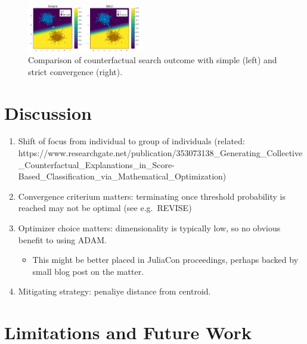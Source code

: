 \documentclass[
  conference]{IEEEtran}
\providecommand{\tightlist}{%
  \setlength{\itemsep}{0pt}\setlength{\parskip}{0pt}}\usepackage{longtable,booktabs,array}
\begin{document}
\begin{figure}

{\centering \includegraphics[width=0.45\textwidth,height=\textheight]{www/gravitational_generator_comparison.png}

}

\caption{\label{fig-convergence}Comparison of counterfactual search
outcome with simple (left) and strict convergence (right).}

\end{figure}

\hypertarget{sec-discussion}{%
\section{Discussion}\label{sec-discussion}}

\begin{enumerate}
\def\labelenumi{\arabic{enumi}.}
\tightlist
\item
  Shift of focus from individual to group of individuals (related:
  https://www.researchgate.net/publication/353073138\_Generating\_Collective\_Counterfactual\_Explanations\_in\_Score-Based\_Classification\_via\_Mathematical\_Optimization)
\item
  Convergence criterium matters: terminating once threshold probability
  is reached may not be optimal (see e.g.~REVISE)
\item
  Optimizer choice matters: dimensionality is typically low, so no
  obvious benefit to using ADAM.

  \begin{itemize}
  \tightlist
  \item
    This might be better placed in JuliaCon proceedings, perhaps backed
    by small blog post on the matter.
  \end{itemize}
\item
  Mitigating strategy: penaliye distance from centroid.
\end{enumerate}

\hypertarget{sec-limit}{%
\section{Limitations and Future Work}\label{sec-limit}}
\end{document}
